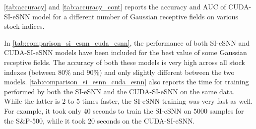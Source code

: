 \tablenames \ref{tab:accuracy} and \ref{tab:accuracy_cont} reports the accuracy and AUC of CUDA-SI-eSNN model for a different number of Gaussian receptive fields on various stock indices. 

In \tablename \ref{tab:comparison_si_esnn_cuda_esnn}, the performance of both SI-eSNN and CUDA-SI-eSNN models have been included for the best value of some Gaussian receptive fields. The accuracy of both these models is very high across all stock indexes (between $80\%$ and $90\%$) and only slightly different between the two models. \tablename \ref{tab:comparison_si_esnn_cuda_esnn} also reports the time for training performed by both the SI-eSNN and the CUDA-SI-eSNN on the same data. While the latter is $2$ to $5$ times faster, the SI-eSNN training was very fast as well. For example, it took only 40 seconds to train the SI-eSNN on $5000$ samples for the S\&P-500, while it took $20$ seconds on the CUDA-SI-eSNN. 


